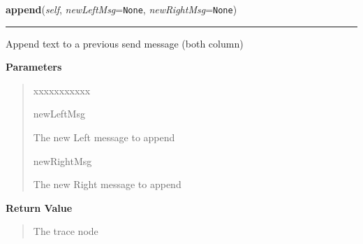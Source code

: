     \label{tracetool:TraceNode:append}

    \vspace{0.5ex}

\hspace{.8\funcindent}\begin{boxedminipage}{\funcwidth}

    \raggedright \textbf{append}(\textit{self}, \textit{newLeftMsg}={\tt None}, \textit{newRightMsg}={\tt None})

    \vspace{-1.5ex}

    \rule{\textwidth}{0.5\fboxrule}
\setlength{\parskip}{2ex}
    Append text to a previous send message (both column)

\setlength{\parskip}{1ex}
      \textbf{Parameters}
      \vspace{-1ex}

      \begin{quote}
        \begin{Ventry}{xxxxxxxxxxx}

          \item[newLeftMsg]

          The new Left message to append

          \item[newRightMsg]

          The new Right message to append

        \end{Ventry}

      \end{quote}

      \textbf{Return Value}
    \vspace{-1ex}

      \begin{quote}
      The trace node

      \end{quote}

    \end{boxedminipage}

    \label{tracetool:TraceNode:setSelected}

    \vspace{0.5ex}

